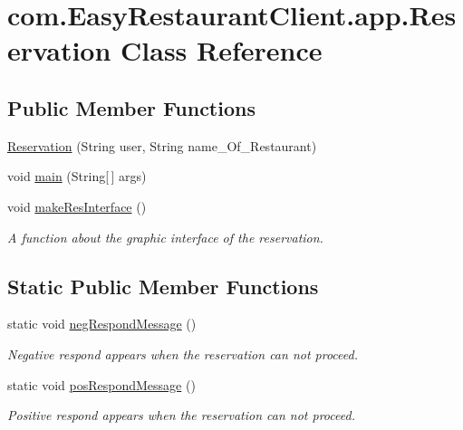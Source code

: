 \hypertarget{classcom_1_1_easy_restaurant_client_1_1app_1_1_reservation}{}\section{com.\+Easy\+Restaurant\+Client.\+app.\+Reservation Class Reference}
\label{classcom_1_1_easy_restaurant_client_1_1app_1_1_reservation}
\subsection*{Public Member Functions}
\begin{DoxyCompactItemize}
\item 
\mbox{\hyperlink{classcom_1_1_easy_restaurant_client_1_1app_1_1_reservation_a2b41c3f3b0c4c91a7538e43a6d61c095}{Reservation}} (String user, String name\+\_\+\+Of\+\_\+\+Restaurant)
\item 
void \mbox{\hyperlink{classcom_1_1_easy_restaurant_client_1_1app_1_1_reservation_ac3b82538dfb0d956e34cde70714680bb}{main}} (String\mbox{[}$\,$\mbox{]} args)
\item 
void \mbox{\hyperlink{classcom_1_1_easy_restaurant_client_1_1app_1_1_reservation_a36f6d71e84c6c9da986d177e44c89f06}{make\+Res\+Interface}} ()
\begin{DoxyCompactList}\small\item\em A function about the graphic interface of the reservation. \end{DoxyCompactList}\end{DoxyCompactItemize}
\subsection*{Static Public Member Functions}
\begin{DoxyCompactItemize}
\item 
static void \mbox{\hyperlink{classcom_1_1_easy_restaurant_client_1_1app_1_1_reservation_a70d4a91da38fa63071daf761d0c95ef4}{neg\+Respond\+Message}} ()
\begin{DoxyCompactList}\small\item\em Negative respond appears when the reservation can not proceed. \end{DoxyCompactList}\item 
static void \mbox{\hyperlink{classcom_1_1_easy_restaurant_client_1_1app_1_1_reservation_a46178be1a9e104195669182c5bec6d6d}{pos\+Respond\+Message}} ()
\begin{DoxyCompactList}\small\item\em Positive respond appears when the reservation can not proceed. \end{DoxyCompactList}\end{DoxyCompactItemize}


